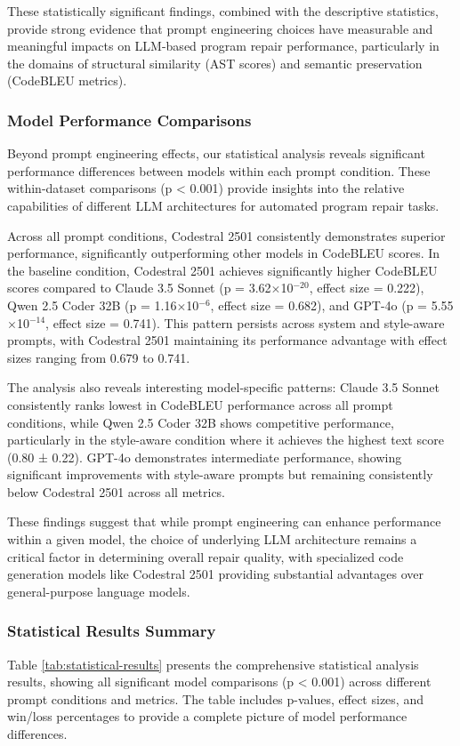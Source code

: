 These statistically significant findings, combined with the descriptive statistics, provide strong evidence that prompt engineering choices have measurable and meaningful impacts on LLM-based program repair performance, particularly in the domains of structural similarity (AST scores) and semantic preservation (CodeBLEU metrics).

\subsubsection{Model Performance Comparisons}
Beyond prompt engineering effects, our statistical analysis reveals significant performance differences between models within each prompt condition. These within-dataset comparisons (p < 0.001) provide insights into the relative capabilities of different LLM architectures for automated program repair tasks.

Across all prompt conditions, Codestral 2501 consistently demonstrates superior performance, significantly outperforming other models in CodeBLEU scores. In the baseline condition, Codestral 2501 achieves significantly higher CodeBLEU scores compared to Claude 3.5 Sonnet (p = 3.62$\times$10$^{-20}$, effect size = 0.222), Qwen 2.5 Coder 32B (p = 1.16$\times$10$^{-6}$, effect size = 0.682), and GPT-4o (p = 5.55$\times$10$^{-14}$, effect size = 0.741). This pattern persists across system and style-aware prompts, with Codestral 2501 maintaining its performance advantage with effect sizes ranging from 0.679 to 0.741.

The analysis also reveals interesting model-specific patterns: Claude 3.5 Sonnet consistently ranks lowest in CodeBLEU performance across all prompt conditions, while Qwen 2.5 Coder 32B shows competitive performance, particularly in the style-aware condition where it achieves the highest text score (0.80 ± 0.22). GPT-4o demonstrates intermediate performance, showing significant improvements with style-aware prompts but remaining consistently below Codestral 2501 across all metrics.

These findings suggest that while prompt engineering can enhance performance within a given model, the choice of underlying LLM architecture remains a critical factor in determining overall repair quality, with specialized code generation models like Codestral 2501 providing substantial advantages over general-purpose language models.

\subsubsection{Statistical Results Summary}
Table \ref{tab:statistical-results} presents the comprehensive statistical analysis results, showing all significant model comparisons (p < 0.001) across different prompt conditions and metrics. The table includes p-values, effect sizes, and win/loss percentages to provide a complete picture of model performance differences.

